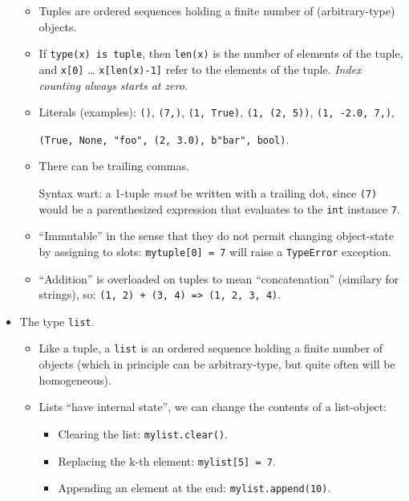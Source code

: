 \documentclass[11pt]{article}
\begin{document}
\begin{itemize}
  \begin{itemize}
  \item
    Tuples are ordered sequences holding a finite number of
    (arbitrary-type) objects.
  \item
    If \texttt{type(x)\ is\ tuple}, then \texttt{len(x)} is the number
    of elements of the tuple, and \texttt{x{[}0{]}} \ldots{}
    \texttt{x{[}len(x)-1{]}} refer to the elements of the tuple.
    \emph{Index counting always starts at zero}.
  \item
    Literals (examples): \texttt{()}, \texttt{(7,)},
    \texttt{(1,\ True)}, \texttt{(1,\ (2,\ 5))},
    \texttt{(1,\ -2.0,\ 7,)},

    \texttt{(True,\ None,\ "foo",\ (2,\ 3.0),\ b"bar",\ bool)}.
  \item
    There can be trailing commas.

    Syntax wart: a 1-tuple \emph{must} be written with a trailing dot,
    since \texttt{(7)} would be a parenthesized expression that
    evaluates to the \texttt{int} instance \texttt{7}.
  \item
    ``Immutable'' in the sense that they do not permit changing
    object-state by assigning to slots: \texttt{mytuple{[}0{]}\ =\ 7}
    will raise a \texttt{TypeError} exception.
  \item
    ``Addition'' is overloaded on tuples to mean ``concatenation''
    (similary for strings), so:
    \texttt{(1,\ 2)\ +\ (3,\ 4)\ =\textgreater{}\ (1,\ 2,\ 3,\ 4)}.
  \end{itemize}
\item
  The type \texttt{list}.

  \begin{itemize}
  \item
    Like a tuple, a \texttt{list} is an ordered sequence holding a
    finite number of objects (which in principle can be arbitrary-type,
    but quite often will be homogeneous).
  \item
    Lists ``have internal state'', we can change the contents of a
    list-object:

    \begin{itemize}
    \item
      Clearing the list: \texttt{mylist.clear()}.
    \item
      Replacing the k-th element: \texttt{mylist{[}5{]}\ =\ 7}.
    \item
      Appending an element at the end: \texttt{mylist.append(10)}.


\end{itemize}
\end{itemize}
\end{itemize}
\end{document}
